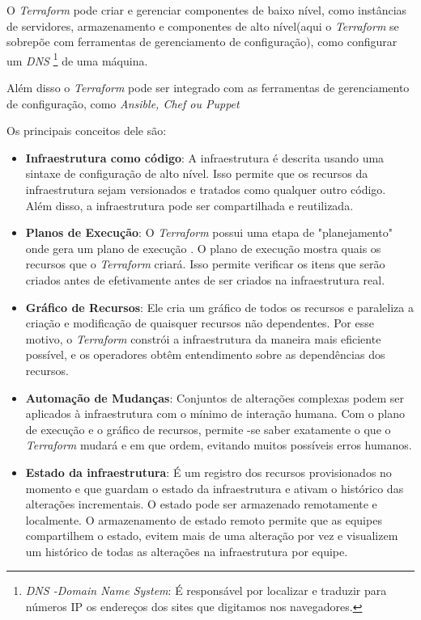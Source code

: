 O \textit{Terraform} pode criar e gerenciar componentes de baixo nível, como instâncias de servidores, armazenamento e componentes de alto nível(aqui o \textit{Terraform} se sobrepõe com ferramentas de gerenciamento de configuração), como configurar um \textit{DNS} \footnote{\textit{DNS -Domain Name System}: É responsável por localizar e traduzir para números IP os endereços dos sites que digitamos nos navegadores.} de uma máquina.

Além disso o \textit{Terraform} pode ser integrado com as ferramentas de gerenciamento de configuração, como \textit{Ansible, Chef ou Puppet}

Os principais conceitos dele são:
 \begin{itemize}
\item \textbf{Infraestrutura como código}: A infraestrutura é descrita usando uma sintaxe de configuração de alto nível. Isso permite que os recursos da infraestrutura sejam versionados e tratados como qualquer outro código. Além disso, a infraestrutura pode ser compartilhada e reutilizada.

\item \textbf{Planos de Execução}: O \textit{Terraform} possui uma etapa de "planejamento" onde gera um plano de execução . O plano de execução mostra quais os recursos que o \textit{Terraform} criará. Isso permite verificar os itens que serão criados antes de efetivamente antes de ser criados na infraestrutura real.

\item \textbf{Gráfico de Recursos}: Ele cria um gráfico de todos os recursos e paraleliza a criação e modificação de quaisquer recursos não dependentes. Por esse motivo, o \textit{Terraform} constrói a infraestrutura da maneira mais eficiente possível, e os operadores obtêm entendimento sobre as dependências dos recursos.

\item \textbf{Automação de Mudanças}: Conjuntos de alterações complexas podem ser aplicados à infraestrutura com o mínimo de interação humana. Com o plano de execução e o gráfico de recursos, permite -se saber exatamente o que o \textit{Terraform} mudará e em que ordem, evitando muitos possíveis erros humanos.

\item \textbf{Estado da infraestrutura}: É um registro dos recursos provisionados no momento e que guardam o estado da infraestrutura e ativam o histórico das alterações incrementais. O estado pode ser armazenado remotamente e localmente. O armazenamento de estado remoto permite que as equipes compartilhem o estado, evitem mais de uma alteração por vez e visualizem um histórico de todas as alterações na infraestrutura por equipe.


\end{itemize}
